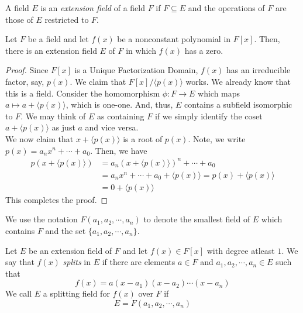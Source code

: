\begin{definition}
	A field $E$ is an \textit{extension field} of a field $F$ if $F\subseteq E$ and the operations of $F$ are those of $E$ restricted to $F$.
\end{definition}

\begin{theorem}[Kroneker, 1887]
	Let $F$ be a field and let $f(x)$ be a nonconstant polynomial in $F[x]$. Then, there is an extension field $E$ of $F$ in which $f(x)$ has a zero.
\end{theorem}
\begin{proof}
	Since $F[x]$ is a Unique Factorization Domain, $f(x)$ has an irreducible factor, say, $p(x)$. We claim that $F[x]/\langle p(x)\rangle$ works. We already know that this is a field. Consider the homomorphism $\phi:F\to E$ which maps $a\mapsto a+\langle p(x)\rangle$, which is one-one. And, thus, $E$ contains a subfield isomorphic to $F$. We may think of $E$ as containing $F$ if we simply identify the coset $a+\langle p(x)\rangle$ as just $a$ and vice versa.\\
	We now claim that $x+\langle p(x)\rangle$ is a root of $p(x)$. Note, we write $p(x)=a_nx^n+\cdots+a_0$. Then, we have 
	\begin{align*}
		p(x+\langle p(x)\rangle) &= a_n(x+\langle p(x)\rangle)^n + \cdots + a_0\\
		&= a_nx^n+\cdots+a_0 + \langle p(x)\rangle = p(x)+\langle p(x)\rangle\\
		&= 0 + \langle p(x)\rangle
	\end{align*} 
	This completes the proof.
\end{proof}

\begin{definition}
	We use the notation $F(a_1,a_2,\cdots,a_n)$ to denote the smallest field of $E$ which contains $F$ and the set $\{a_1,a_2,\cdots,a_n\}$.
\end{definition}

\begin{definition}
	Let $E$ be an extension field of $F$ and let $f(x)\in F[x]$ with degree atleast $1$. We say that $f(x)$ \textit{splits} in $E$ if there are elements $a\in F$ and $a_1,a_2,\cdots,a_n\in E$ such that 
	\begin{equation*}
		f(x) = a(x-a_1)(x-a_2)\cdots(x-a_n)
	\end{equation*}	
	We call $E$ a splitting field for $f(x)$ over $F$ if 
	\begin{equation*}
		E = F(a_1,a_2,\cdots,a_n)
	\end{equation*}
\end{definition}

